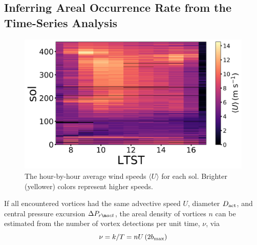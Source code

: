 \documentclass{aastex63}
\begin{document}

\subsection{Inferring Areal Occurrence Rate from the Time-Series Analysis}
\label{sec:Inferring Dust Devil Density from the Time-Series Analysis}

\begin{figure}
    \centering
    \includegraphics[width=\textwidth]{figures/advective_speeds.png}
    \caption{The hour-by-hour average wind speeds $\langle U \rangle$ for each sol. Brighter (yellower) colors represent higher speeds.}
    \label{fig:advective_speeds}
\end{figure}

If all encountered vortices had the same advective speed $U$, diameter $D_{\rm act}$, and central pressure excursion $\Delta P_{r\m act}$, the areal density of vortices $n$ can be estimated from the number of vortex detections per unit time, $\nu$, via
\begin{equation}
    \nu = k/T = n U \left( 2 b_{\rm max} \right) \label{eqn:simple_number_of_encounters}
\end{equation}
\end{document}
